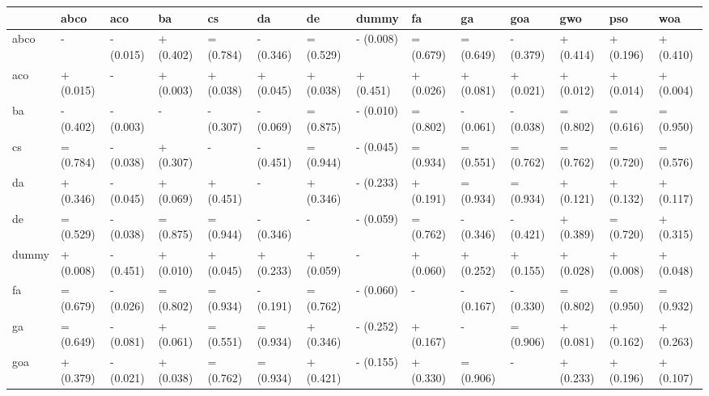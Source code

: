 \begin{table}
    \centering
    \begin{adjustbox}{width=\linewidth}
        \begin{tabular}{llllllllllllll}
            \toprule
            {}    & abco      & aco       & ba        & cs        & da        & de        & dummy     & fa        & ga        & goa       & gwo       & pso       & woa       \\
            \midrule
            abco  & -         & - (0.015) & + (0.402) & = (0.784) & - (0.346) & = (0.529) & - (0.008) & = (0.679) & = (0.649) & - (0.379) & + (0.414) & + (0.196) & + (0.410) \\
            aco   & + (0.015) & -         & + (0.003) & + (0.038) & + (0.045) & + (0.038) & + (0.451) & + (0.026) & + (0.081) & + (0.021) & + (0.012) & + (0.014) & + (0.004) \\
            ba    & - (0.402) & - (0.003) & -         & - (0.307) & - (0.069) & = (0.875) & - (0.010) & = (0.802) & - (0.061) & - (0.038) & = (0.802) & = (0.616) & = (0.950) \\
            cs    & = (0.784) & - (0.038) & + (0.307) & -         & - (0.451) & = (0.944) & - (0.045) & = (0.934) & = (0.551) & = (0.762) & = (0.762) & = (0.720) & = (0.576) \\
            da    & + (0.346) & - (0.045) & + (0.069) & + (0.451) & -         & + (0.346) & - (0.233) & + (0.191) & = (0.934) & = (0.934) & + (0.121) & + (0.132) & + (0.117) \\
            de    & = (0.529) & - (0.038) & = (0.875) & = (0.944) & - (0.346) & -         & - (0.059) & = (0.762) & - (0.346) & - (0.421) & + (0.389) & = (0.720) & + (0.315) \\
            dummy & + (0.008) & - (0.451) & + (0.010) & + (0.045) & + (0.233) & + (0.059) & -         & + (0.060) & + (0.252) & + (0.155) & + (0.028) & + (0.008) & + (0.048) \\
            fa    & = (0.679) & - (0.026) & = (0.802) & = (0.934) & - (0.191) & = (0.762) & - (0.060) & -         & - (0.167) & - (0.330) & = (0.802) & = (0.950) & = (0.932) \\
            ga    & = (0.649) & - (0.081) & + (0.061) & = (0.551) & = (0.934) & + (0.346) & - (0.252) & + (0.167) & -         & = (0.906) & + (0.081) & + (0.162) & + (0.263) \\
            goa   & + (0.379) & - (0.021) & + (0.038) & = (0.762) & = (0.934) & + (0.421) & - (0.155) & + (0.330) & = (0.906) & -         & + (0.233) & + (0.196) & + (0.107) \\

\end{tabular}
\end{adjustbox}
\end{table}
